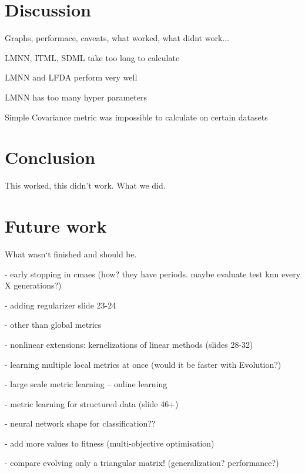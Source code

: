 \documentclass[12pt,a4paper]{report}
\begin{document}

\chapter{Discussion}

Graphs, performace, caveats, what worked, what didnt work...

LMNN, ITML, SDML take too long to calculate

LMNN and LFDA perform very well

LMNN has too many hyper parameters

Simple Covariance metric was impossible to calculate on certain datasets


\chapter*{Conclusion}

This worked, this didn't work. What we did.

\chapter*{Future work}


What wasn`t finished and should be.

- early stopping in cmaes (how? they have periods. maybe evaluate test knn every X generations?)

- adding regularizer slide 23-24

- other than global metrics

- nonlinear extensions: kernelizations of linear methods (slides 28-32)

- learning multiple local metrics at once (would it be faster with Evolution?)

- large scale metric learning -- online learning

- metric learning for structured data (slide 46+)

- neural network shape for classification??

- add more values to fitness (multi-objective optimisation)

- compare evolving only a triangular matrix! (generalization? performance?)
\end{document}
